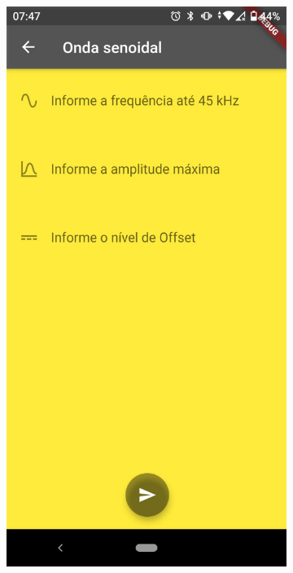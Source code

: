 \documentclass[12pt,a4paper]{book}
\begin{document}
\begin{figure}
    \centering
        
    \begin{subfigure}[b]{0.3\textwidth}
        \centering
        \includegraphics[width=\textwidth]{figs/sin.png}

\end{subfigure}
\end{figure}
\end{document}
